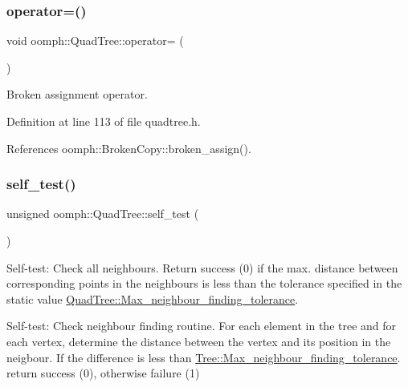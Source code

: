 \mbox{\label{classoomph_1_1QuadTree_a5aa0ce0775cb4295ccdd6e7a20c80e11}} 
\subsubsection{\texorpdfstring{operator=()}{operator=()}}
{\footnotesize\ttfamily void oomph\+::\+Quad\+Tree\+::operator= (\begin{DoxyParamCaption}\item[{const \hyperlink{classoomph_1_1QuadTree}{Quad\+Tree} \&}]{ }\end{DoxyParamCaption})\hspace{0.3cm}{\ttfamily [inline]}}



Broken assignment operator. 



Definition at line 113 of file quadtree.\+h.



References oomph\+::\+Broken\+Copy\+::broken\+\_\+assign().

\mbox{\label{classoomph_1_1QuadTree_aa8bb42eac81f1b1b8bc7eb3e82fc5e29}} 
\subsubsection{\texorpdfstring{self\+\_\+test()}{self\_test()}}
{\footnotesize\ttfamily unsigned oomph\+::\+Quad\+Tree\+::self\+\_\+test (\begin{DoxyParamCaption}{ }\end{DoxyParamCaption})}



Self-\/test\+: Check all neighbours. Return success (0) if the max. distance between corresponding points in the neighbours is less than the tolerance specified in the static value \hyperlink{classoomph_1_1Tree_aef9abebc166fa3bf81ecb59ec0d5d6b2}{Quad\+Tree\+::\+Max\+\_\+neighbour\+\_\+finding\+\_\+tolerance}. 

Self-\/test\+: Check neighbour finding routine. For each element in the tree and for each vertex, determine the distance between the vertex and its position in the neigbour. If the difference is less than \hyperlink{classoomph_1_1Tree_aef9abebc166fa3bf81ecb59ec0d5d6b2}{Tree\+::\+Max\+\_\+neighbour\+\_\+finding\+\_\+tolerance}. return success (0), otherwise failure (1) 

